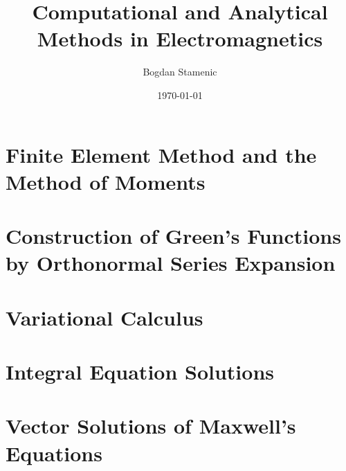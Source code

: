 

\newcommand{\FormelsammlungTitel}{Computational and Analytical Methods in Electromagnetics}
\newcommand{\FormelsammlungAutor}{Bogdan Stamenic}
\setcounter{tocdepth}{2} %


	\title{\FormelsammlungTitel}
	\author{\FormelsammlungAutor}
	\date{\today}
	\begin{multicols*}{3}
			\maketitle
			\tableofcontents
		
		
		
		\section{Finite Element Method and the Method of Moments}
        \lipsum[4]
		\section{Construction of Green's Functions by Orthonormal Series Expansion}
        \lipsum[5]
		\section{Variational Calculus}
        \lipsum[6]
		\section{Integral Equation Solutions}
        \lipsum[7]
		\section{Vector Solutions of Maxwell's Equations}
        \lipsum[8]
	\end{multicols*}

